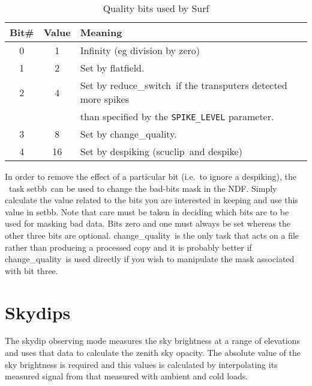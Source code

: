 \documentclass[twoside,11pt]{article}
\newcommand{\scusoft}          {{\sc Surf}}
\newcommand{\Kappa}{\xref{{\sc{Kappa}}}{sun95}{}}
\newcommand{\task}[1]{{\sf #1}}
\newcommand{\param}[1]{{\tt #1}}
\newcommand{\chgqual}{\htmlref{\task{change\_quality}}{CHANGE_QUALITY}}
\newcommand{\resw}{\htmlref{\task{reduce\_switch}}{REDUCE_SWITCH}}
\newcommand{\flatf}{\htmlref{\task{flatfield}}{FLATFIELD}}
\newcommand{\despike}{\htmlref{\task{despike}}{DESPIKE}}
\newcommand{\scuclip}{\htmlref{\task{scuclip}}{SCUCLIP}}
\newcommand{\setbb}{\xref{\task{setbb}}{sun95}{SETBB}}
\newcommand{\htmlref}[2]{#1}
\newcommand{\xref}[3]{#1}
\newcommand{\xlabel}[1]{}
\begin{document}
\begin{table}
\caption{Quality bits used by \scusoft}
\label{badbits}
\begin{center}
\begin{tabular}{ccl}
\hline\hline
Bit\# & Value & Meaning \\ \hline
0 & 1  &Infinity (eg division by zero) \\
1 & 2  &Set by \flatf.\\
2 & 4  &Set by \resw\ if the transputers detected more spikes\\
  &    & than specified by the \param{SPIKE\_LEVEL} parameter.\\
3 & 8  &Set by \chgqual.\\
4 & 16 &Set by despiking (\scuclip\ and \despike)\\ \hline\hline
\end{tabular}
\end{center}
\end{table}

In order to remove the effect of a particular bit (i.e.\ to ignore a
despiking), the \Kappa\ task \setbb\ can be used to change the bad-bits
mask in the NDF. Simply calculate the value related to the bits you are
interested in keeping and use this value in \setbb. Note that care must
be taken in deciding which bits are to be used for masking bad data. Bits zero
and one must always be set whereas the other three bits are
optional. \chgqual\ is the only task that acts on a file rather than producing
a processed copy and it is probably better if \chgqual\ is used directly if
you wish to manipulate the mask associated with bit three.




\section{\xlabel{skydips}Skydips\label{skydips}}

The skydip observing mode measures the sky brightness at a range of elevations
and uses that data to calculate the zenith sky opacity. The absolute 
value of the sky brightness is required and this values 
is calculated by interpolating its measured signal from that measured with
ambient and cold loads.
\end{document}
